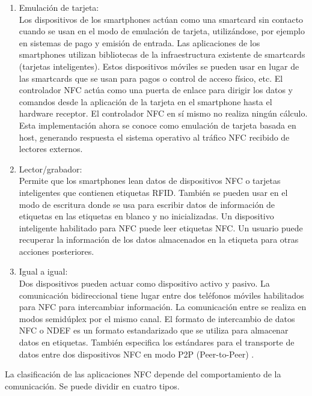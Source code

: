 \documentclass[12pt,a4paper,onecolumn,oneside]{report}
\newcounter{subsubsubsection}[subsubsection]
\begin{document}
\begin{enumerate}

\item Emulación de tarjeta:\\
Los dispositivos de los smartphones actúan como una smartcard sin contacto cuando se usan en el modo de emulación de tarjeta,  utilizándose, por ejemplo en sistemas de pago y emisión de entrada. Las aplicaciones de los smartphones utilizan bibliotecas de la infraestructura existente de smartcards (tarjetas inteligentes). Estos dispositivos móviles se pueden usar en lugar de las smartcards que se usan para pagos o control de acceso físico, etc. El controlador NFC actúa como una puerta de enlace para dirigir los datos y comandos desde la aplicación de la tarjeta en el smartphone hasta el hardware receptor. El controlador NFC en sí mismo no realiza ningún cálculo. Esta implementación ahora se conoce como emulación de tarjeta basada en host, generando respuesta el sistema operativo al tráfico NFC recibido de lectores externos.

\item Lector/grabador:\\
Permite que los smartphones lean datos de dispositivos NFC o tarjetas inteligentes que contienen etiquetas RFID. También se pueden usar en el modo de escritura donde se usa para escribir datos de información de etiquetas en las etiquetas en blanco y no inicializadas. Un dispositivo inteligente habilitado para NFC puede leer etiquetas NFC. Un usuario puede recuperar la información de los datos almacenados en la etiqueta para otras acciones posteriores.

\item Igual a igual:\\
Dos dispositivos pueden actuar como dispositivo activo y pasivo. La comunicación bidireccional tiene lugar entre dos teléfonos móviles habilitados para NFC para intercambiar información. La comunicación entre se realiza en modos semidúplex por el mismo canal. El formato de intercambio de datos NFC o NDEF \cite{cinco} es un formato estandarizado que se utiliza para almacenar datos en etiquetas. También especifica los estándares para el transporte de datos entre dos dispositivos NFC en modo P2P (Peer-to-Peer) \cite{seis}. 

\end{enumerate}


La clasificación de las aplicaciones NFC depende del comportamiento de la comunicación. Se puede dividir en cuatro tipos.
\end{document}
